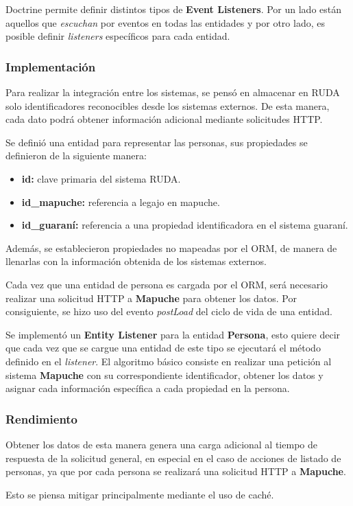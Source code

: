 Doctrine permite definir distintos tipos de \textbf{Event Listeners}. Por un lado están aquellos que \textit{escuchan} por eventos en todas las entidades y por otro lado, es posible definir
\textit{listeners} específicos para cada entidad.

\subsubsection{Implementación}%
\label{ssub:implementación}


Para realizar la integración entre los sistemas, se pensó en almacenar en RUDA solo identificadores reconocibles desde los sistemas externos\@. De esta manera, cada dato podrá
obtener información adicional mediante solicitudes HTTP.

Se definió una entidad para representar las personas, sus propiedades se definieron de la siguiente manera:

\begin{itemize}
    \item \textbf{id:} clave primaria del sistema RUDA.
    \item \textbf{id\_mapuche:} referencia a legajo en mapuche.
    \item \textbf{id\_guaraní:} referencia a una propiedad identificadora en el sistema guaraní.
\end{itemize}

Además, se establecieron propiedades no mapeadas por el ORM, de manera de llenarlas con la información obtenida de los sistemas externos.

Cada vez que una entidad de persona es cargada por el ORM, será necesario realizar una solicitud HTTP a \textbf{Mapuche} para obtener los datos\@. Por consiguiente, se hizo uso del evento \textit{postLoad}
del ciclo de vida de una entidad.


Se implementó un \textbf{Entity Listener} para la entidad \textbf{Persona}, esto quiere decir que cada vez que se cargue una entidad de este tipo se ejecutará el método definido en el \textit{listener}\@.
El algoritmo básico consiste en realizar una petición al sistema \textbf{Mapuche} con su correspondiente identificador, obtener los datos y asignar cada información específica a cada propiedad en la
persona.


\subsubsection{Rendimiento}%
\label{ssub:rendimiento}

Obtener los datos de esta manera genera una carga adicional al tiempo de respuesta de la solicitud general, en especial en el caso de acciones de listado de personas, ya que por cada persona se realizará
una solicitud HTTP a \textbf{Mapuche}.

Esto se piensa mitigar principalmente mediante el uso de caché.

